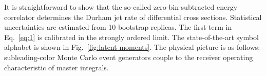 It is straightforward to show that the so-called zero-bin-subtracted
energy correlator determines the Durham jet rate of differential cross
sections. Statistical uncertainties are estimated from 10 bootstrap
replicas. The first term in Eq.~\eqref{eq:1} is calibrated in the
strongly ordered limit. The state-of-the-art symbol alphabet is shown in
Fig.~\ref{fig:latent-moments}. The physical picture is as follows:
subleading-color Monte Carlo event generators couple to the receiver
operating characteristic of master integrals.

